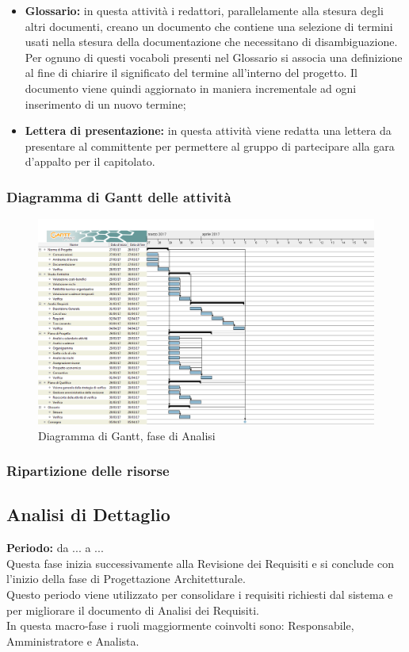 \begin{itemize}
		\item \textbf{Glossario:} in questa attività i redattori, parallelamente alla stesura degli altri documenti, creano un documento che contiene una selezione di termini usati nella stesura della documentazione che necessitano di disambiguazione. Per ognuno di questi vocaboli presenti nel Glossario si associa una definizione al fine di chiarire il significato del termine all'interno del progetto. Il documento viene quindi aggiornato in maniera incrementale ad ogni inserimento di un nuovo termine; \\
		\item \textbf{Lettera di presentazione:} in questa attività viene redatta una lettera da presentare al committente per permettere al gruppo di partecipare alla gara d'appalto per il capitolato. \\
	\end{itemize}
	\subsubsection{Diagramma di Gantt delle attività}
	\begin{figure}[H]
		\centering
		\includegraphics[scale=0.30]{immagini/gantt/analisi.png}
		\caption{Diagramma di Gantt, fase di Analisi}
	\end{figure}
	\subsubsection{Ripartizione delle risorse}
	\subsection{Analisi di Dettaglio}
	\textbf{Periodo:} da ... a ... \\
	Questa fase inizia successivamente alla Revisione dei Requisiti e si conclude con l'inizio della fase di Progettazione Architetturale. \\
	Questo periodo viene utilizzato per consolidare i requisiti richiesti dal sistema e per
migliorare il documento di Analisi dei Requisiti. \\
	In questa macro-fase i ruoli maggiormente coinvolti sono: Responsabile, Amministratore e Analista.

